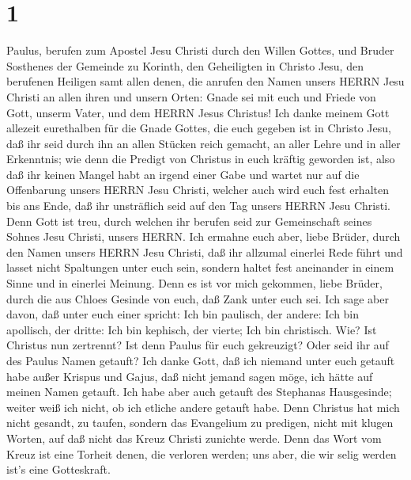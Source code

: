 \hypertarget{section}{%
\section{1}\label{section}}

 Paulus, berufen zum Apostel Jesu Christi durch den Willen
Gottes, und Bruder Sosthenes  der Gemeinde zu Korinth, den
Geheiligten in Christo Jesu, den berufenen Heiligen samt allen denen,
die anrufen den Namen unsers HERRN Jesu Christi an allen ihren und
unsern Orten:  Gnade sei mit euch und Friede von Gott,
unserm Vater, und dem HERRN Jesus Christus!  Ich danke
meinem Gott allezeit eurethalben für die Gnade Gottes, die euch gegeben
ist in Christo Jesu,  daß ihr seid durch ihn an allen
Stücken reich gemacht, an aller Lehre und in aller Erkenntnis;
 wie denn die Predigt von Christus in euch kräftig geworden
ist,  also daß ihr keinen Mangel habt an irgend einer Gabe
und wartet nur auf die Offenbarung unsers HERRN Jesu Christi,
 welcher auch wird euch fest erhalten bis ans Ende, daß ihr
unsträflich seid auf den Tag unsers HERRN Jesu Christi. 
Denn Gott ist treu, durch welchen ihr berufen seid zur Gemeinschaft
seines Sohnes Jesu Christi, unsers HERRN.  Ich ermahne euch
aber, liebe Brüder, durch den Namen unsers HERRN Jesu Christi, daß ihr
allzumal einerlei Rede führt und lasset nicht Spaltungen unter euch
sein, sondern haltet fest aneinander in einem Sinne und in einerlei
Meinung.  Denn es ist vor mich gekommen, liebe Brüder,
durch die aus Chloes Gesinde von euch, daß Zank unter euch sei.
 Ich sage aber davon, daß unter euch einer spricht: Ich bin
paulisch, der andere: Ich bin apollisch, der dritte: Ich bin kephisch,
der vierte; Ich bin christisch.  Wie? Ist Christus nun
zertrennt? Ist denn Paulus für euch gekreuzigt? Oder seid ihr auf des
Paulus Namen getauft?  Ich danke Gott, daß ich niemand
unter euch getauft habe außer Krispus und Gajus,  daß nicht
jemand sagen möge, ich hätte auf meinen Namen getauft.  Ich
habe aber auch getauft des Stephanas Hausgesinde; weiter weiß ich nicht,
ob ich etliche andere getauft habe.  Denn Christus hat mich
nicht gesandt, zu taufen, sondern das Evangelium zu predigen, nicht mit
klugen Worten, auf daß nicht das Kreuz Christi zunichte werde.
 Denn das Wort vom Kreuz ist eine Torheit denen, die
verloren werden; uns aber, die wir selig werden ist's eine Gotteskraft.
